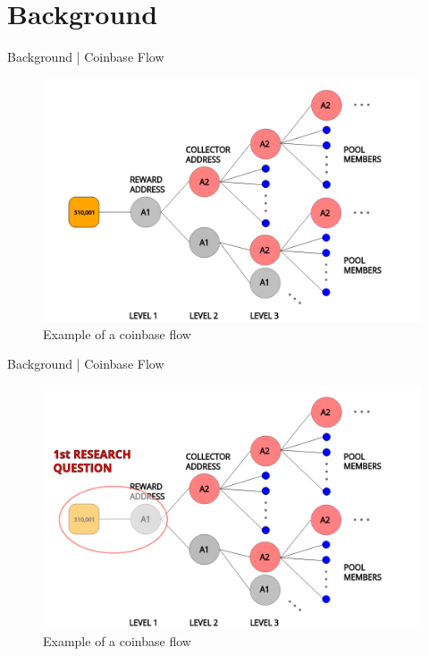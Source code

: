 \documentclass[10pt]{beamer}
\begin{document}
\section{Background} 
\begin{frame}[fragile]{Background | Coinbase Flow}
    \begin{figure}
        \includegraphics[width=.8\textwidth]{images/flow_example.png}
        \\Example of a coinbase flow
    \end{figure}
\end{frame}

\begin{frame}[fragile]{Background | Coinbase Flow}
    \begin{figure}
        \includegraphics[width=.8\textwidth]{images/1rq.png}
        \\Example of a coinbase flow
    \end{figure}
\end{frame}
\end{document}
